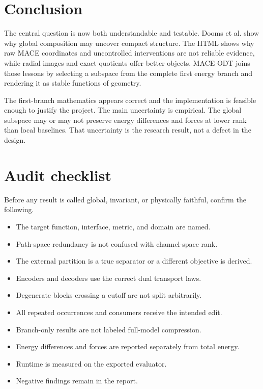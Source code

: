 \documentclass[10pt,twocolumn]{article}
\begin{document}
\section{Conclusion}

The central question is now both understandable and testable. Dooms et al. show why global composition may uncover compact structure. The HTML shows why raw MACE coordinates and uncontrolled interventions are not reliable evidence, while radial images and exact quotients offer better objects. MACE-ODT joins those lessons by selecting a subspace from the complete first energy branch and rendering it as stable functions of geometry.

The first-branch mathematics appears correct and the implementation is feasible enough to justify the project. The main uncertainty is empirical. The global subspace may or may not preserve energy differences and forces at lower rank than local baselines. That uncertainty is the research result, not a defect in the design.




\appendix

\section{Audit checklist}

Before any result is called global, invariant, or physically faithful, confirm the following.

\begin{itemize}[leftmargin=1.3em]
\item The target function, interface, metric, and domain are named.
\item Path-space redundancy is not confused with channel-space rank.
\item The external partition is a true separator or a different objective is derived.
\item Encoders and decoders use the correct dual transport laws.
\item Degenerate blocks crossing a cutoff are not split arbitrarily.
\item All repeated occurrences and consumers receive the intended edit.
\item Branch-only results are not labeled full-model compression.
\item Energy differences and forces are reported separately from total energy.
\item Runtime is measured on the exported evaluator.
\item Negative findings remain in the report.
\end{itemize}
\end{document}

